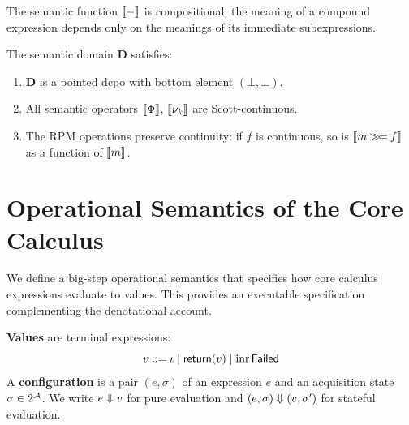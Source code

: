 \begin{proposition}[Compositionality]
\label{prop:denotational-compositionality}
The semantic function $\llbracket - \rrbracket$ is compositional: the meaning of a compound expression
depends only on the meanings of its immediate subexpressions.
\end{proposition}

\begin{theorem}
\label{thm:sem-domain-props}
The semantic domain $\mathbf{D}$ satisfies:
\begin{enumerate}[label=(\roman*)]
    \item $\mathbf{D}$ is a pointed dcpo with bottom element $(\bot, \bot)$.
    \item All semantic operators $\llbracket \Phi \rrbracket$, $\llbracket \nu_{k} \rrbracket$ are Scott-continuous.
    \item The RPM operations preserve continuity: if $f$ is continuous, so is
          $\llbracket m \mathbin{\gg\!=} f \rrbracket$ as a function of $\llbracket m \rrbracket$.
\end{enumerate}
\end{theorem}

\section{Operational Semantics of the Core Calculus}
\label{sec:core-operational}

We define a big-step operational semantics that specifies how core calculus expressions
evaluate to values. This provides an executable specification complementing the
denotational account.

\begin{definition}
\label{def:operational-values}
\textbf{Values} are terminal expressions:
\[
v ::= \iota \mid \mathsf{return}(v) \mid \mathrm{inr}\,\mathsf{Failed}
\]
A \textbf{configuration} is a pair $(e, \sigma)$ of an expression $e$ and an acquisition
state $\sigma \in 2^{\mathcal{A}}$. We write $e \Downarrow v$ for pure evaluation and
$(e, \sigma) \Downarrow (v, \sigma')$ for stateful evaluation.
\end{definition}

